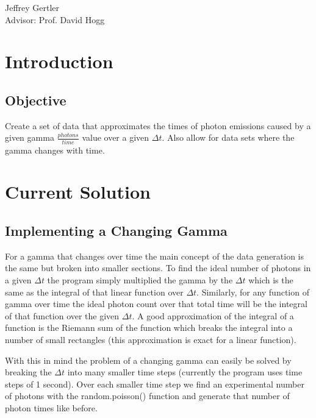 \documentclass[aps,letterpaper,10pt]{revtex4}
\begin{document}
\begin{center}
Jeffrey Gertler \\ \vspace{14pt}
Advisor: Prof. David Hogg \\ \vspace{14pt}

\end{center}

\section{Introduction}
\subsection{Objective}
Create a set of data that approximates the times of photon emissions caused by a given gamma $\frac{photons}{time}$ value over a given $\Delta t$. Also allow for data sets where the gamma changes with time.


\section{Current Solution}


\subsection{Implementing a Changing Gamma}
For a gamma that changes over time the main concept of the data generation is the same but broken into smaller sections. To find the ideal number of photons in a given  $\Delta t$ the program simply multiplied the gamma by the  $\Delta t$ which is the same as the integral of that linear function over  $\Delta t$. Similarly, for any function of gamma over time the ideal photon count over that total time will be the integral of that function over the given  $\Delta t$. A good approximation of the integral of a function is the Riemann sum of the function which breaks the integral into a number of small rectangles (this approximation is exact for a linear function).
\vspace{3mm}

With this in mind the problem of a changing gamma can easily be solved by breaking the  $\Delta t$ into many smaller time steps (currently the program uses time steps of 1 second). Over each smaller time step we find an experimental number of photons with the random.poisson() function and generate that number of photon times like before.
\vspace{3mm}
\end{document}
